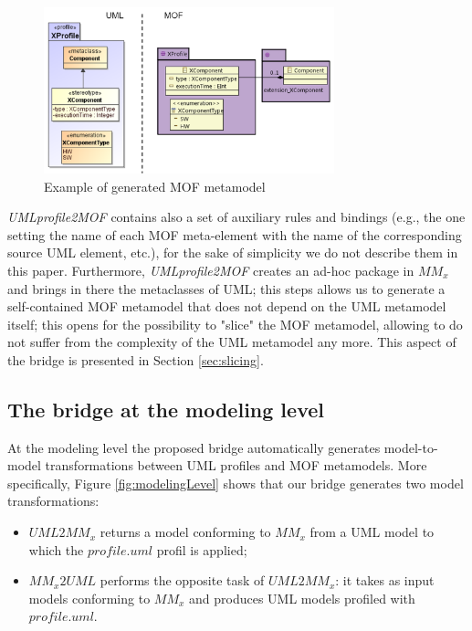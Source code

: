 \begin{figure}[htbp]
	\centering
		\includegraphics[width=0.75\textwidth]{figures/metamodelingExample.png}
	\caption{Example of generated MOF metamodel}
	\label{fig:metamodelingExample}
\end{figure}
%
\textit{UMLprofile2MOF} contains also a set of auxiliary rules and bindings (e.g., the one setting the name of each MOF meta-element with the name of the corresponding source UML element, etc.), for the sake of simplicity we do not describe them in this paper.
Furthermore, \textit{UMLprofile2MOF} creates an ad-hoc package in $MM_x$ and brings in there the metaclasses of UML;
this steps allows us to generate a self-contained MOF metamodel that does not depend on the UML metamodel itself; this opens for the possibility to 
"slice" the MOF metamodel, allowing to do not suffer from the complexity of the UML metamodel any more. 
This aspect of the bridge is presented in Section \ref{sec:slicing}.





\subsection{The bridge at the modeling level}\label{sec:modeLevel}

At the modeling level the proposed bridge automatically generates model-to-model transformations between UML profiles and MOF metamodels.
More specifically, Figure \ref{fig:modelingLevel} shows that our bridge generates two model transformations:
%
\begin{itemize}
	\item $UML2MM_x$ returns a model conforming to $MM_x$ from a UML model to which the $profile.uml$ profil is applied; 
	\item $MM_x2UML$ performs the opposite task of $UML2MM_x$: it takes as input models conforming to $MM_x$ 
	and produces UML models profiled with $profile.uml$.
\end{itemize}

